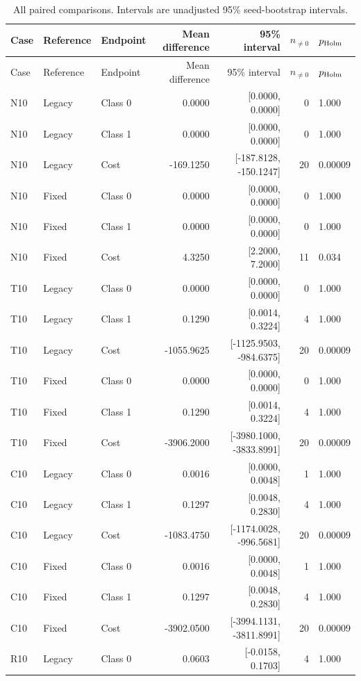 \documentclass[10pt,a4paper]{article}
\begin{document}
\begin{longtable}{lllrrrl}
\caption{All paired comparisons. Intervals are unadjusted 95\% seed-bootstrap intervals.}\\
\toprule Case & Reference & Endpoint & Mean difference & 95\% interval & $n_{\ne0}$ & $p_{\rm Holm}$\\\midrule\endfirsthead
\toprule Case & Reference & Endpoint & Mean difference & 95\% interval & $n_{\ne0}$ & $p_{\rm Holm}$\\\midrule\endhead
\bottomrule\endfoot
N10 & Legacy & Class 0 & 0.0000 & [0.0000, 0.0000] & 0 & 1.000 \\
N10 & Legacy & Class 1 & 0.0000 & [0.0000, 0.0000] & 0 & 1.000 \\
N10 & Legacy & Cost & -169.1250 & [-187.8128, -150.1247] & 20 & 0.00009 \\
N10 & Fixed & Class 0 & 0.0000 & [0.0000, 0.0000] & 0 & 1.000 \\
N10 & Fixed & Class 1 & 0.0000 & [0.0000, 0.0000] & 0 & 1.000 \\
N10 & Fixed & Cost & 4.3250 & [2.2000, 7.2000] & 11 & 0.034 \\
T10 & Legacy & Class 0 & 0.0000 & [0.0000, 0.0000] & 0 & 1.000 \\
T10 & Legacy & Class 1 & 0.1290 & [0.0014, 0.3224] & 4 & 1.000 \\
T10 & Legacy & Cost & -1055.9625 & [-1125.9503, -984.6375] & 20 & 0.00009 \\
T10 & Fixed & Class 0 & 0.0000 & [0.0000, 0.0000] & 0 & 1.000 \\
T10 & Fixed & Class 1 & 0.1290 & [0.0014, 0.3224] & 4 & 1.000 \\
T10 & Fixed & Cost & -3906.2000 & [-3980.1000, -3833.8991] & 20 & 0.00009 \\
C10 & Legacy & Class 0 & 0.0016 & [0.0000, 0.0048] & 1 & 1.000 \\
C10 & Legacy & Class 1 & 0.1297 & [0.0048, 0.2830] & 4 & 1.000 \\
C10 & Legacy & Cost & -1083.4750 & [-1174.0028, -996.5681] & 20 & 0.00009 \\
C10 & Fixed & Class 0 & 0.0016 & [0.0000, 0.0048] & 1 & 1.000 \\
C10 & Fixed & Class 1 & 0.1297 & [0.0048, 0.2830] & 4 & 1.000 \\
C10 & Fixed & Cost & -3902.0500 & [-3994.1131, -3811.8991] & 20 & 0.00009 \\
R10 & Legacy & Class 0 & 0.0603 & [-0.0158, 0.1703] & 4 & 1.000 \\

\end{longtable}
\end{document}
